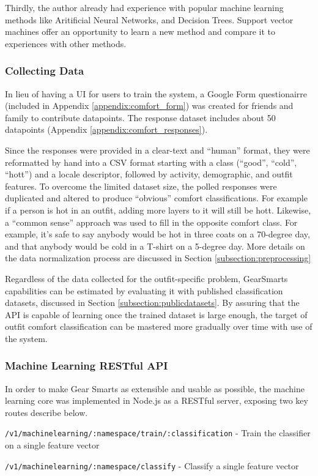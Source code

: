 Thirdly, the author already had experience with popular machine learning methods like Aritificial Neural Networks, and
Decision Trees. Support vector machines offer an opportunity to learn a new method and compare it to experiences with
other methods.

\subsubsection{Collecting Data}
In lieu of having a UI for users to train the system, a Google Form questionairre (included in Appendix
\ref{appendix:comfort_form}) was created for
friends and family to contribute datapoints. The response dataset includes about 50 datapoints (Appendix \ref{appendix:comfort_responses}).

Since the responses were provided in a clear-text and ``human'' format, they were reformatted by hand into a CSV format
starting with a class (``good'', ``cold'', ``hott'') and a locale descriptor, followed by activity, demographic, and
outfit features. To overcome the limited dataset size, the polled responses were duplicated and altered to produce ``obvious''
comfort classifications. For example if a person is hot in an outfit, adding more layers to it will still be hott.
Likewise, a ``common sense'' approach was used to fill in the opposite comfort class. For example, it's safe to say anybody
would be hot in three coats on a 70-degree day, and that anybody would be cold in a T-shirt on a 5-degree day.
More details on the data normalization process are discussed in Section \ref{subsection:preprocessing}

Regardless of the data collected for the outfit-specific problem, GearSmarts capabilities can be estimated by evaluating
it with published classification datasets, discussed in Section \ref{subsection:publicdatasets}. By assuring that the API
is capable of learning once the trained dataset is large enough, the target of outfit comfort classification
can be mastered more gradually over time with use of the system.

\subsubsection{Machine Learning RESTful API}
\label{section:mlapi}
In order to make Gear Smarts as extensible and usable as possible, the machine learning core was implemented in Node.js
as a RESTful server, exposing two key routes describe below.

\begin{description}
    \item{\texttt{/v1/machinelearning/:namespace/train/:classification}} - Train the classifier on a single feature vector
    \item{\texttt{/v1/machinelearning/:namespace/classify}} - Classify a single feature vector
\end{description}


